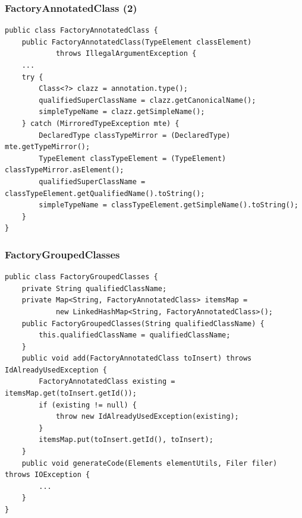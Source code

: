 \documentclass[xetex,mathserif,serif]{beamer}
\begin{document}
	\begin{frame}[fragile]
		\frametitle{FactoryAnnotatedClass (2)}
		\begin{footnotesize}
			\begin{verbatim}
public class FactoryAnnotatedClass {
    public FactoryAnnotatedClass(TypeElement classElement) 
            throws IllegalArgumentException {
    ...
    try {
        Class<?> clazz = annotation.type();
        qualifiedSuperClassName = clazz.getCanonicalName();
        simpleTypeName = clazz.getSimpleName();
    } catch (MirroredTypeException mte) {
        DeclaredType classTypeMirror = (DeclaredType) mte.getTypeMirror();
        TypeElement classTypeElement = (TypeElement) classTypeMirror.asElement();
        qualifiedSuperClassName = classTypeElement.getQualifiedName().toString();
        simpleTypeName = classTypeElement.getSimpleName().toString();
    }
}
			\end{verbatim}
		\end{footnotesize}
	\end{frame}

	\begin{frame}[fragile]
		\frametitle{FactoryGroupedClasses}
		\begin{footnotesize}
			\begin{verbatim}
public class FactoryGroupedClasses {
    private String qualifiedClassName;
    private Map<String, FactoryAnnotatedClass> itemsMap =
            new LinkedHashMap<String, FactoryAnnotatedClass>();
    public FactoryGroupedClasses(String qualifiedClassName) {
        this.qualifiedClassName = qualifiedClassName;
    }
    public void add(FactoryAnnotatedClass toInsert) throws IdAlreadyUsedException {
        FactoryAnnotatedClass existing = itemsMap.get(toInsert.getId());
        if (existing != null) {
            throw new IdAlreadyUsedException(existing);
        }
        itemsMap.put(toInsert.getId(), toInsert);
    }
    public void generateCode(Elements elementUtils, Filer filer) throws IOException {
        ...
    }
}
			\end{verbatim}
		\end{footnotesize}
	\end{frame}
\end{document}
